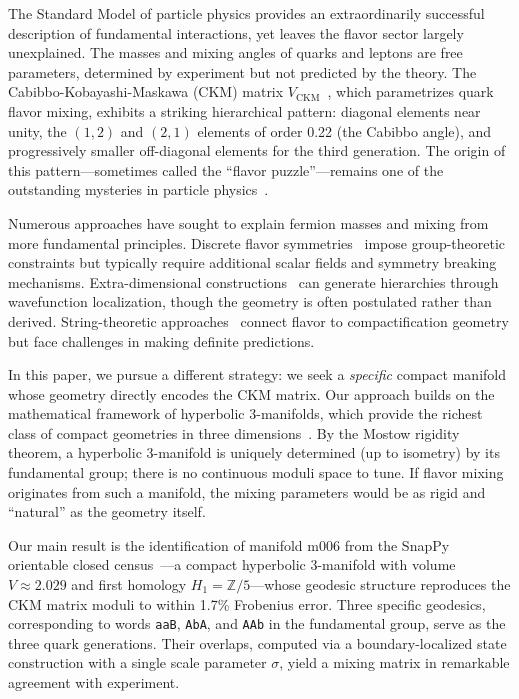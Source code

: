 \documentclass[11pt,a4paper]{article}
\newcommand{\CKM}{V_{\mathrm{CKM}}}
\begin{document}
The Standard Model of particle physics provides an extraordinarily 
successful description of fundamental interactions, yet leaves the 
flavor sector largely unexplained. The masses and mixing angles of 
quarks and leptons are free parameters, determined by experiment but 
not predicted by the theory. The Cabibbo-Kobayashi-Maskawa (CKM) matrix 
$\CKM$~\cite{Cabibbo1963,KobayashiMaskawa1973}, which parametrizes 
quark flavor mixing, exhibits a striking hierarchical pattern: diagonal 
elements near unity, the $(1,2)$ and $(2,1)$ elements of order 0.22 
(the Cabibbo angle), and progressively smaller off-diagonal elements 
for the third generation. The origin of this pattern---sometimes called 
the ``flavor puzzle''---remains one of the outstanding mysteries in 
particle physics~\cite{Feruglio2015}.

Numerous approaches have sought to explain fermion masses and mixing 
from more fundamental principles. Discrete flavor 
symmetries~\cite{AltarelliFeruglio2010,King2017} impose group-theoretic 
constraints but typically require additional scalar fields and symmetry 
breaking mechanisms. Extra-dimensional 
constructions~\cite{ArkaniHamed1999,Randall1999} can generate hierarchies 
through wavefunction localization, though the geometry is often 
postulated rather than derived. String-theoretic 
approaches~\cite{Ibanez2012} connect flavor to compactification geometry 
but face challenges in making definite predictions.

In this paper, we pursue a different strategy: we seek a \emph{specific} 
compact manifold whose geometry directly encodes the CKM matrix. Our 
approach builds on the mathematical framework of hyperbolic 3-manifolds, 
which provide the richest class of compact geometries in three 
dimensions~\cite{Thurston1997}. By the Mostow rigidity theorem, a 
hyperbolic 3-manifold is uniquely determined (up to isometry) by its 
fundamental group; there is no continuous moduli space to tune. If 
flavor mixing originates from such a manifold, the mixing parameters 
would be as rigid and ``natural'' as the geometry itself.

Our main result is the identification of manifold m006 from the SnapPy 
orientable closed census~\cite{SnapPy}---a compact hyperbolic 3-manifold 
with volume $V \approx 2.029$ and first homology $H_1 = \mathbb{Z}/5$---whose 
geodesic structure reproduces the CKM matrix moduli to within 1.7\% 
Frobenius error. Three specific geodesics, corresponding to words 
\texttt{aaB}, \texttt{AbA}, and \texttt{AAb} in the fundamental group, 
serve as the three quark generations. Their overlaps, computed via a 
boundary-localized state construction with a single scale parameter 
$\sigma$, yield a mixing matrix in remarkable agreement with experiment.
\end{document}
